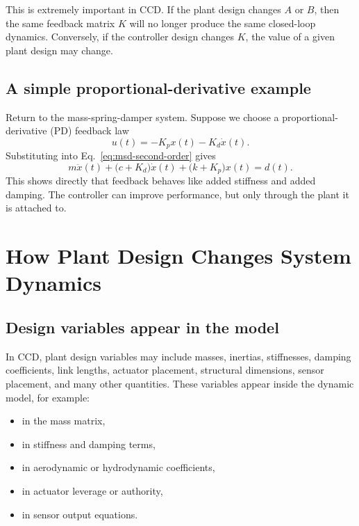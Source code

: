 \documentclass[11pt]{article}
\begin{document}
This is extremely important in CCD. If the plant design changes $A$ or $B$, then the same feedback matrix $K$ will no longer produce the same closed-loop dynamics. Conversely, if the controller design changes $K$, the value of a given plant design may change.

\subsection{A simple proportional-derivative example}

Return to the mass-spring-damper system. Suppose we choose a proportional-derivative (PD) feedback law
\begin{equation}
 u(t)=-K_p x(t)-K_d \dot{x}(t).
\label{eq:pd-law}
\end{equation}
Substituting into Eq.~\eqref{eq:msd-second-order} gives
\begin{equation}
 m\ddot{x}(t) + \big(c+K_d\big)\dot{x}(t) + \big(k+K_p\big)x(t)=d(t).
\label{eq:effective-pd}
\end{equation}
This shows directly that feedback behaves like added stiffness and added damping. The controller can improve performance, but only through the plant it is attached to.

\section{How Plant Design Changes System Dynamics}

\subsection{Design variables appear in the model}

In CCD, plant design variables may include masses, inertias, stiffnesses, damping coefficients, link lengths, actuator placement, structural dimensions, sensor placement, and many other quantities. These variables appear inside the dynamic model, for example:
\begin{itemize}[leftmargin=1.4em]
  \item in the mass matrix,
  \item in stiffness and damping terms,
  \item in aerodynamic or hydrodynamic coefficients,
  \item in actuator leverage or authority,
  \item in sensor output equations.
\end{itemize}
\end{document}
